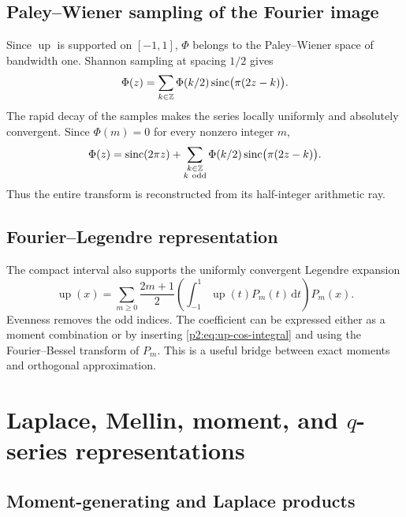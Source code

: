 \documentclass[11pt]{article}
\theoremstyle{definition}
\theoremstyle{remark}
\newcommand{\dd}{\,\mathrm d}
\newcommand{\Up}{\operatorname{up}}
\begin{document}
\subsection{Paley--Wiener sampling of the Fourier image}

Since $\Up$ is supported on $[-1,1]$, $\Phi$ belongs to the Paley--Wiener space of bandwidth
one.  Shannon sampling at spacing $1/2$ gives
\begin{equation}
 \Phi(z)=\sum_{k\in\mathbb Z}\Phi(k/2)
 \operatorname{sinc}\bigl(\pi(2z-k)\bigr).                             \label{p2:eq:Phi-Shannon}
\end{equation}
The rapid decay of the samples makes the series locally uniformly and absolutely
convergent.  Since $\Phi(m)=0$ for every nonzero integer $m$,
\begin{equation}
 \Phi(z)=\operatorname{sinc}(2\pi z)+
 \sum_{\substack{k\in\mathbb Z\\k\ \mathrm{odd}}}
 \Phi(k/2)\operatorname{sinc}\bigl(\pi(2z-k)\bigr).                   \label{p2:eq:Phi-Shannon-odd}
\end{equation}
Thus the entire transform is reconstructed from its half-integer arithmetic ray.

\subsection{Fourier--Legendre representation}

The compact interval also supports the uniformly convergent Legendre expansion
\begin{equation}
 \Up(x)=\sum_{m\ge0}\frac{2m+1}{2}
 \left(\int_{-1}^1\Up(t)P_m(t)\dd t\right)P_m(x).        \label{p2:eq:Legendre}
\end{equation}
Evenness removes the odd indices.  The coefficient can be expressed either as a moment
combination or by inserting \eqref{p2:eq:up-cos-integral} and using the Fourier--Bessel transform
of $P_m$.  This is a useful bridge between exact moments and orthogonal approximation.

\section{Laplace, Mellin, moment, and \texorpdfstring{$q$}{q}-series representations}
\label{p2:sec:laplace-moments}

\subsection{Moment-generating and Laplace products}
\end{document}
